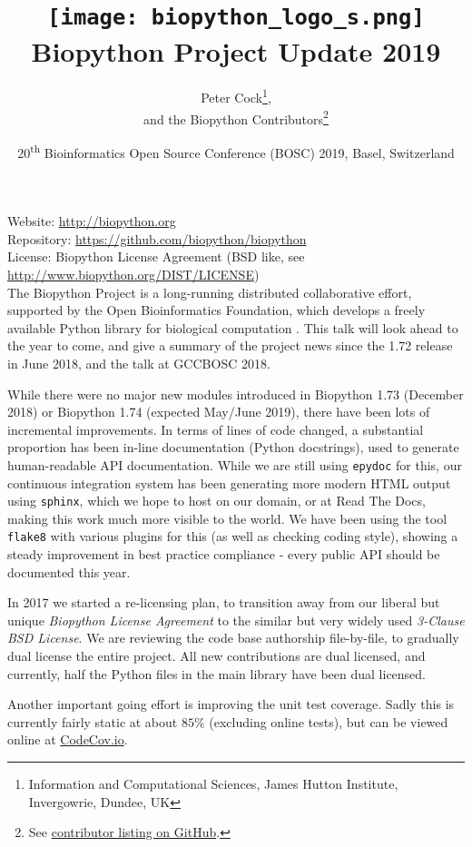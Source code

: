 \documentclass[10pt,oneside]{article}
\title{%
\vspace{-1.5in}
\texttt{[image: biopython\_logo\_s.png]} \\
\vspace{3mm}Biopython Project Update 2019}
\author{
    Peter Cock\thanks{Information and Computational Sciences, James Hutton Institute, Invergowrie, Dundee, UK},\\
    and the Biopython Contributors\thanks{See \href{https://github.com/biopython/biopython/blob/master/CONTRIB.rst}{contributor listing on GitHub}.}}
\date{20\textsuperscript{th} Bioinformatics Open Source Conference (BOSC) 2019, Basel, Switzerland}
\begin{document}
\maketitle
\thispagestyle{empty}

\vspace{-0.2in}
\noindent
Website: \url{http://biopython.org} \\
Repository: \url{https://github.com/biopython/biopython} \\
License: Biopython License Agreement (BSD like, see \url{http://www.biopython.org/DIST/LICENSE}) \\

The Biopython Project is a long-running distributed collaborative effort,
supported by the Open Bioinformatics Foundation, which develops a freely
available Python library for biological computation \cite{AppNote}. This
talk will look ahead to the year to come, and give a summary of the project
news since the 1.72 release in June 2018, and the talk at GCCBOSC 2018.

While there were no major new modules introduced in Biopython 1.73
(December 2018) or Biopython 1.74 (expected May/June 2019), there have
been lots of incremental improvements.
In terms of lines of code changed, a substantial proportion has been
in-line documentation (Python docstrings), used to generate human-readable
API documentation. While we are still using \texttt{epydoc} for this, our continuous
integration system has been generating more modern HTML output using \texttt{sphinx},
which we hope to host on our domain, or at Read The Docs, making this work
much more visible to the world. We have been using the tool \texttt{flake8}
with various plugins for this (as well as checking coding style), showing
a steady improvement in best practice compliance - every public API should
be documented this year.

In 2017 we started a re-licensing plan, to transition away
from our liberal but unique \emph{Biopython License Agreement} to the similar
but very widely used \emph{3-Clause BSD License}. We are reviewing the code
base authorship file-by-file, to gradually dual license the entire project.
All new contributions are dual licensed, and currently, half the Python files
in the main library have been dual licensed.

Another important going effort is improving the unit test coverage. Sadly
this is currently fairly static at about $85\%$ (excluding online tests),
but can be viewed online at
\href{https://codecov.io/github/biopython/biopython/}{CodeCov.io}.
\end{document}
